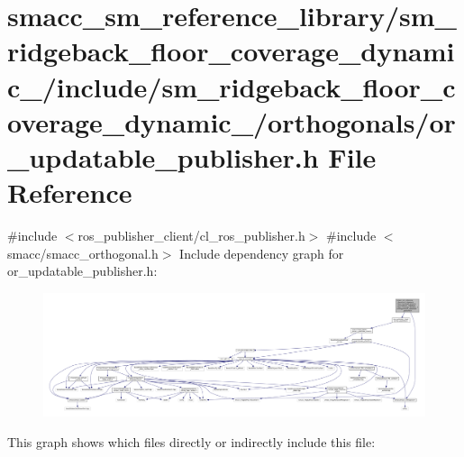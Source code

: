 \hypertarget{sm__ridgeback__floor__coverage__dynamic__1_2include_2sm__ridgeback__floor__coverage__dynamic__1_442962b705c5574c55d200a44351e668}{}\section{smacc\+\_\+sm\+\_\+reference\+\_\+library/sm\+\_\+ridgeback\+\_\+floor\+\_\+coverage\+\_\+dynamic\+\_/include/sm\+\_\+ridgeback\+\_\+floor\+\_\+coverage\+\_\+dynamic\+\_/orthogonals/or\+\_\+updatable\+\_\+publisher.h File Reference}
\label{sm__ridgeback__floor__coverage__dynamic__1_2include_2sm__ridgeback__floor__coverage__dynamic__1_442962b705c5574c55d200a44351e668}
{\ttfamily \#include $<$ros\+\_\+publisher\+\_\+client/cl\+\_\+ros\+\_\+publisher.\+h$>$}\newline
{\ttfamily \#include $<$smacc/smacc\+\_\+orthogonal.\+h$>$}\newline
Include dependency graph for or\+\_\+updatable\+\_\+publisher.\+h\+:
\nopagebreak
\begin{figure}[H]
\begin{center}
\leavevmode
\includegraphics[width=350pt]{sm__ridgeback__floor__coverage__dynamic__1_2include_2sm__ridgeback__floor__coverage__dynamic__1_b7f3b9c50af4d8bbbf2e5fb7a5cae309}
\end{center}
\end{figure}
This graph shows which files directly or indirectly include this file\+:
\nopagebreak

